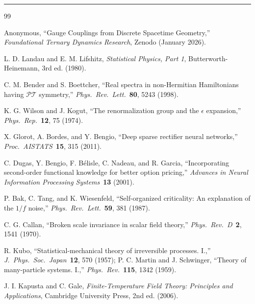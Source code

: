 \documentclass[12pt]{article}
\theoremstyle{definition}
\theoremstyle{remark}
\begin{document}
\vspace{2em}
\hrule
\vspace{1.5em}

\begin{thebibliography}{99}

Anonymous,
``Gauge Couplings from Discrete Spacetime Geometry,''
\textit{Foundational Ternary Dynamics Research}, Zenodo (January 2026).

L. D. Landau and E. M. Lifshitz,
\textit{Statistical Physics, Part 1},
Butterworth-Heinemann, 3rd ed. (1980).

C. M. Bender and S. Boettcher,
``Real spectra in non-Hermitian Hamiltonians having $\mathcal{PT}$ symmetry,''
\textit{Phys.\ Rev.\ Lett.}\ \textbf{80}, 5243 (1998).

K. G. Wilson and J. Kogut,
``The renormalization group and the $\epsilon$ expansion,''
\textit{Phys.\ Rep.}\ \textbf{12}, 75 (1974).

X. Glorot, A. Bordes, and Y. Bengio,
``Deep sparse rectifier neural networks,''
\textit{Proc.\ AISTATS}\ \textbf{15}, 315 (2011).

C. Dugas, Y. Bengio, F. B\'{e}lisle, C. Nadeau, and R. Garcia,
``Incorporating second-order functional knowledge for better option pricing,''
\textit{Advances in Neural Information Processing Systems}\ \textbf{13} (2001).

P. Bak, C. Tang, and K. Wiesenfeld,
``Self-organized criticality: An explanation of the $1/f$ noise,''
\textit{Phys.\ Rev.\ Lett.}\ \textbf{59}, 381 (1987).

C. G. Callan,
``Broken scale invariance in scalar field theory,''
\textit{Phys.\ Rev.\ D}\ \textbf{2}, 1541 (1970).

R. Kubo,
``Statistical-mechanical theory of irreversible processes. I.,''
\textit{J.\ Phys.\ Soc.\ Japan}\ \textbf{12}, 570 (1957);
P. C. Martin and J. Schwinger,
``Theory of many-particle systems. I.,''
\textit{Phys.\ Rev.}\ \textbf{115}, 1342 (1959).

J. I. Kapusta and C. Gale,
\textit{Finite-Temperature Field Theory: Principles and Applications},
Cambridge University Press, 2nd ed. (2006).

\end{thebibliography}
\end{document}

